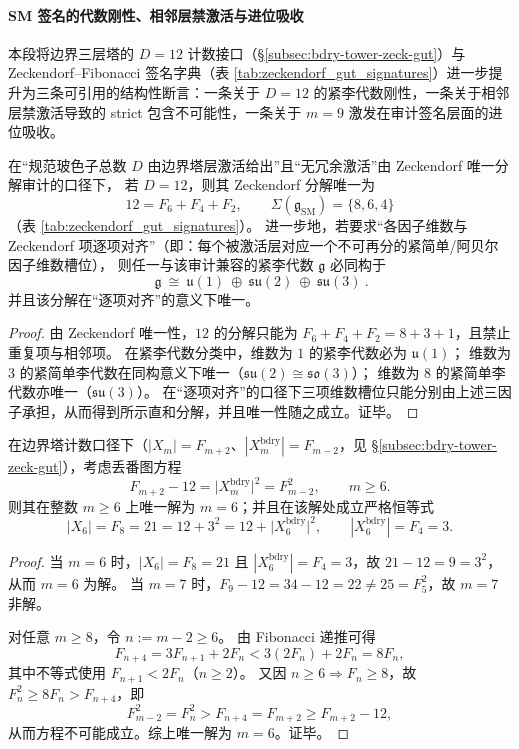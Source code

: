 \paragraph{SM 签名的代数刚性、相邻层禁激活与进位吸收}\label{par:bdry-tower-sm-rigidity-adjacent-carry}
本段将边界三层塔的 \(D=12\) 计数接口（\S\ref{subsec:bdry-tower-zeck-gut}）与 Zeckendorf--Fibonacci 签名字典（表 \ref{tab:zeckendorf_gut_signatures}）进一步提升为三条可引用的结构性断言：一条关于 \(D=12\) 的紧李代数刚性，一条关于相邻层禁激活导致的 strict 包含不可能性，一条关于 \(m=9\) 激发在审计签名层面的进位吸收。

\begin{proposition}\label{prop:sm-zeckendorf-lie-algebra-rigidity}
在“规范玻色子总数 \(D\) 由边界塔层激活给出”且“无冗余激活”由 Zeckendorf 唯一分解审计的口径下，
若 \(D=12\)，则其 Zeckendorf 分解唯一为
\[
12=F_{6}+F_{4}+F_{2},
\qquad
\Sigma(\mathfrak g_{\mathrm{SM}})=\{8,6,4\}
\]
（表 \ref{tab:zeckendorf_gut_signatures}）。
进一步地，若要求“各因子维数与 Zeckendorf 项逐项对齐”（即：每个被激活层对应一个不可再分的紧简单/阿贝尔因子维数槽位），
则任一与该审计兼容的紧李代数 \(\mathfrak g\) 必同构于
\[
\boxed{\ \mathfrak g\ \cong\ \mathfrak u(1)\ \oplus\ \mathfrak{su}(2)\ \oplus\ \mathfrak{su}(3)\ }.
\]
并且该分解在“逐项对齐”的意义下唯一。
\end{proposition}
\begin{proof}
由 Zeckendorf 唯一性，\(12\) 的分解只能为 \(F_6+F_4+F_2=8+3+1\)，且禁止重复项与相邻项。
在紧李代数分类中，维数为 \(1\) 的紧李代数必为 \(\mathfrak u(1)\)；
维数为 \(3\) 的紧简单李代数在同构意义下唯一（\(\mathfrak{su}(2)\cong\mathfrak{so}(3)\)）；
维数为 \(8\) 的紧简单李代数亦唯一（\(\mathfrak{su}(3)\)）。
在“逐项对齐”的口径下三项维数槽位只能分别由上述三因子承担，从而得到所示直和分解，并且唯一性随之成立。证毕。
\end{proof}

\begin{theorem}[window-\(6\) 的平方余量刚性：\texorpdfstring{$F_{m+2}-12=F_{m-2}^2$}{F_{m+2}-12=F_{m-2}^2} 的唯一解]\label{thm:sm-square-residual-rigidity-m6}
在边界塔计数口径下（\(|X_m|=F_{m+2}\)、\(|X_m^{\mathrm{bdry}}|=F_{m-2}\)，见 \S\ref{subsec:bdry-tower-zeck-gut}），考虑丢番图方程
\[
F_{m+2}-12=\bigl|X_m^{\mathrm{bdry}}\bigr|^2=F_{m-2}^2,
\qquad m\ge 6.
\]
则其在整数 \(m\ge 6\) 上唯一解为 \(m=6\)；并且在该解处成立严格恒等式
\[
|X_6|=F_8=21=12+3^2
=12+\bigl|X_6^{\mathrm{bdry}}\bigr|^2,
\qquad |X_6^{\mathrm{bdry}}|=F_4=3.
\]
\end{theorem}
\begin{proof}
当 \(m=6\) 时，\(|X_6|=F_8=21\) 且 \(|X_6^{\mathrm{bdry}}|=F_4=3\)，故 \(21-12=9=3^2\)，从而 \(m=6\) 为解。
当 \(m=7\) 时，\(F_9-12=34-12=22\neq 25=F_5^2\)，故 \(m=7\) 非解。
\par
对任意 \(m\ge 8\)，令 \(n:=m-2\ge 6\)。
由 Fibonacci 递推可得
\[
F_{n+4}=3F_{n+1}+2F_n<3(2F_n)+2F_n=8F_n,
\]
其中不等式使用 \(F_{n+1}<2F_n\)（\(n\ge 2\)）。
又因 \(n\ge 6\Rightarrow F_n\ge 8\)，故 \(F_n^2\ge 8F_n>F_{n+4}\)，即
\[
F_{m-2}^2=F_n^2>F_{n+4}=F_{m+2}\ge F_{m+2}-12,
\]
从而方程不可能成立。综上唯一解为 \(m=6\)。证毕。
\end{proof}

